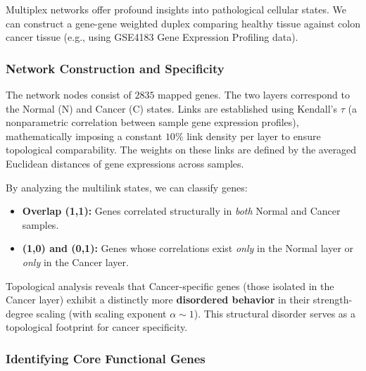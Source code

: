 Multiplex networks offer profound insights into pathological cellular states. We can construct a gene-gene weighted duplex comparing healthy tissue against colon cancer tissue (e.g., using GSE4183 Gene Expression Profiling data).

\subsubsection{Network Construction and Specificity}
\label{subsubsec:cancer_network_construction}

The network nodes consist of \(2835\) mapped genes. The two layers correspond to the Normal (N) and Cancer (C) states. Links are established using Kendall's \(\tau\) (a nonparametric correlation between sample gene expression profiles), mathematically imposing a constant \(10\%\) link density per layer to ensure topological comparability. The weights on these links are defined by the averaged Euclidean distances of gene expressions across samples.

By analyzing the multilink states, we can classify genes:
\begin{itemize}
    \item \textbf{Overlap (1,1):} Genes correlated structurally in \textit{both} Normal and Cancer samples.
    \item \textbf{(1,0) and (0,1):} Genes whose correlations exist \textit{only} in the Normal layer or \textit{only} in the Cancer layer.
\end{itemize}


Topological analysis reveals that Cancer-specific genes (those isolated in the Cancer layer) exhibit a distinctly more \textbf{disordered behavior} in their strength-degree scaling (with scaling exponent \(\alpha \sim 1\)). This structural disorder serves as a topological footprint for cancer specificity.

\subsubsection{Identifying Core Functional Genes}
\label{subsubsec:core_functional_genes}


